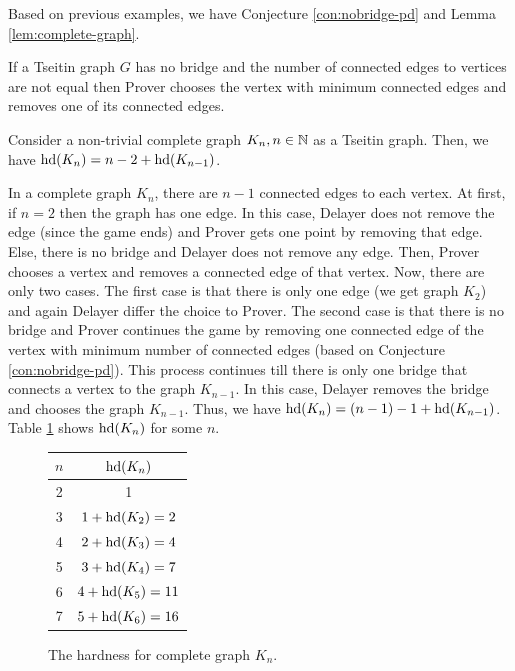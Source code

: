 \documentclass{report}
\begin{document}
Based on previous examples, we have Conjecture \ref{con:nobridge-pd} and Lemma \ref{lem:complete-graph}.
\begin{conj}\label{con:nobridge-pd}
If a Tseitin graph $G$ has no bridge and the number of connected edges to vertices are not equal then Prover chooses the vertex with minimum connected edges and removes one of its connected edges.
\end{conj}

\begin{lem}\label{lem:complete-graph}
Consider a non-trivial complete graph $K_n, n \in \mathbb{N}$ as a Tseitin graph. Then, we have $\operatorname{hd}(K_n)= n-2+\operatorname{hd}(K_{n-1})$. 
\end{lem}	
\begin{prf}
In a complete graph $K_n$, there are $n-1$ connected edges to each vertex. At first, if $n =2$ then the graph has one edge. In this case, Delayer does not remove the edge (since the game ends) and Prover gets one point by removing that edge. Else, there is no bridge and Delayer does not remove any edge. Then, Prover chooses a vertex and removes a connected edge of that vertex. Now, there are only two cases. The first case is that there is only one edge (we get graph $K_2$) and again Delayer differ the choice to Prover. The second case is that there is no bridge and Prover continues the game by removing one connected edge of the vertex with minimum number of connected edges (based on Conjecture \ref{con:nobridge-pd}). This process continues till there is only one bridge that connects a vertex to the graph $K_{n-1}$. In this case, Delayer removes the bridge and chooses the graph $K_{n-1}$. Thus, we have $\operatorname{hd}(K_n)= (n-1)-1+\operatorname{hd}(K_{n-1}) $. Table \ref{fig:table1} shows $\operatorname{hd}(K_n)$ for some $n$.
   \begin{figure}[h]
   \centering
   \begin{tabular}{|c|c|} 
                  \hline
                  $n$ & $\operatorname{hd}(K_n)$ \\ \hline
		  2 & 1  \\ \hline
		  3 & $1+ \operatorname{hd}(K_2)=2$ \\ \hline
		  4 & $2+ \operatorname{hd}(K_3)=4$  \\ \hline
	   	  5 & $3+ \operatorname{hd}(K_4)=7$  \\ \hline
		  6 & $4+ \operatorname{hd}(K_5)=11$  \\ \hline
		  7 & $5+ \operatorname{hd}(K_6)=16$  \\ \hline
   \end{tabular}
   \caption{The hardness for complete graph $K_n$.}  \label{fig:table1}
   \end{figure}
\end{prf}
\end{document}
